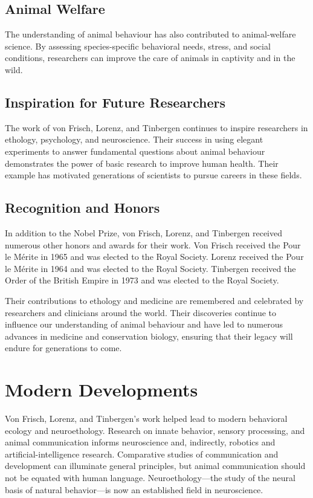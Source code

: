 \subsection{Animal Welfare}

The understanding of animal behaviour has also contributed to animal-welfare science. By assessing species-specific behavioral needs, stress, and social conditions, researchers can improve the care of animals in captivity and in the wild.

\subsection{Inspiration for Future Researchers}

The work of von Frisch, Lorenz, and Tinbergen continues to inspire researchers in ethology, psychology, and neuroscience. Their success in using elegant experiments to answer fundamental questions about animal behaviour demonstrates the power of basic research to improve human health. Their example has motivated generations of scientists to pursue careers in these fields.

\subsection{Recognition and Honors}

In addition to the Nobel Prize, von Frisch, Lorenz, and Tinbergen received numerous other honors and awards for their work. Von Frisch received the Pour le M\'erite in 1965 and was elected to the Royal Society. Lorenz received the Pour le M\'erite in 1964 and was elected to the Royal Society. Tinbergen received the Order of the British Empire in 1973 and was elected to the Royal Society.

Their contributions to ethology and medicine are remembered and celebrated by researchers and clinicians around the world. Their discoveries continue to influence our understanding of animal behaviour and have led to numerous advances in medicine and conservation biology, ensuring that their legacy will endure for generations to come.


\section{Modern Developments}

Von Frisch, Lorenz, and Tinbergen's work helped lead to modern behavioral ecology and neuroethology. Research on innate behavior, sensory processing, and animal communication informs neuroscience and, indirectly, robotics and artificial-intelligence research. Comparative studies of communication and development can illuminate general principles, but animal communication should not be equated with human language. Neuroethology---the study of the neural basis of natural behavior---is now an established field in neuroscience.


